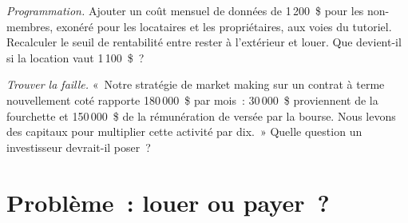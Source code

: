 \begin{exercise}[$\star\star\star$]\label{exo:m1:getting-access-futures-options:7}
\emph{Programmation.} Ajouter un coût mensuel de données de 1\,200~\$ pour les non-membres, exonéré pour
les locataires et les propriétaires, aux voies du tutoriel. Recalculer le seuil de
rentabilité entre rester à l'extérieur et louer. Que devient-il si la location
vaut 1\,100~\$~?
\end{exercise}

\begin{exercise}[$\star\star\star$]\label{exo:m1:getting-access-futures-options:8}
\emph{Trouver la faille.} «~Notre stratégie de market making sur un contrat à terme nouvellement coté
rapporte 180\,000~\$ par mois~: 30\,000~\$ proviennent de la fourchette et 150\,000~\$ de
la rémunération de  versée par la bourse. Nous levons des capitaux pour
multiplier cette activité par dix.~» Quelle question un investisseur devrait-il poser~?
\end{exercise}

\section{Problème~: louer ou payer~?}

